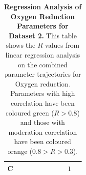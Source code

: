 \begin{table}[p]
{\begin{minipage}{24.4cm}
\begin{tabular}{|c|c|c|c|c|c|c|c|c|c|}
    \hline
    \cellcolor{dark-gray}C & \cellcolor{light-gray} & \cellcolor{light-gray} & \cellcolor{light-gray} & \cellcolor{light-gray} & \cellcolor{light-gray} & \cellcolor{light-gray} & \cellcolor{light-gray} & \cellcolor{light-gray}$1$ \\
    \hline
  \end{tabular}
  \caption[Regression Analysis of Oxygen Reduction Parameters]{{\bf Regression Analysis of Oxygen Reduction Parameters for Dataset 2.} This table shows the $R$ values from linear regression analysis on the combined parameter trajectories for Oxygen reduction. Parameters with high correlation have been coloured green ($R>0.8$) and those with moderation correlation have been coloured orange ($0.8>R>0.3$).
  \label{tab:noregress1}}
  \end{minipage}
  }
\end{table}
\afterpage{\clearpage}

